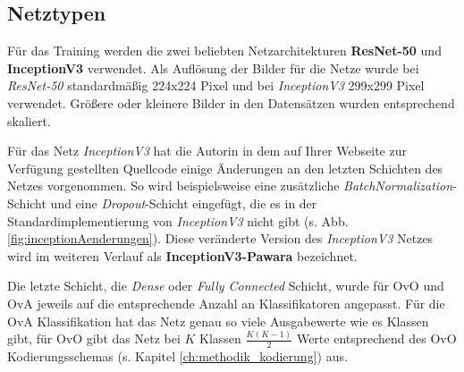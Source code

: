 \subsection{Netztypen}
\label{ch:methodik_netze}
Für das Training werden die zwei beliebten Netzarchitekturen \textbf{ResNet-50} und \textbf{InceptionV3} verwendet. Als Auflösung der Bilder für die Netze wurde bei \textit{ResNet-50} standardmäßig 224x224 Pixel und bei \textit{InceptionV3} 299x299 Pixel verwendet. Größere oder kleinere Bilder in den Datensätzen wurden entsprechend skaliert.

Für das Netz \textit{InceptionV3} hat die Autorin in dem auf Ihrer Webseite zur Verfügung gestellten Quellcode \cite{pawaraWebsiteCode} einige Änderungen an den letzten Schichten des Netzes vorgenommen. So wird beispielsweise eine zusätzliche \textit{BatchNormalization}-Schicht und eine \textit{Dropout}-Schicht eingefügt, die es in der Standardimplementierung von \textit{InceptionV3} nicht gibt (s. Abb. \ref{fig:inceptionAenderungen}). Diese veränderte Version des \textit{InceptionV3} Netzes wird im weiteren Verlauf als \textbf{InceptionV3-Pawara} bezeichnet.

Die letzte Schicht, die \textit{Dense} oder \textit{Fully Connected} Schicht, wurde für OvO und OvA jeweils auf die entsprechende Anzahl an Klassifikatoren angepasst. Für die OvA Klassifikation hat das Netz genau so viele Ausgabewerte wie es Klassen gibt, für OvO gibt das Netz bei $K$ Klassen $\frac{K(K-1)}{2}$ Werte entsprechend des OvO Kodierungsschemas (s. Kapitel \ref{ch:methodik_kodierung}) aus.


